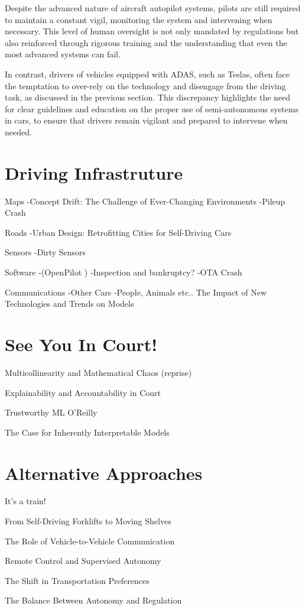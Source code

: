 Despite the advanced nature of aircraft autopilot systems, pilots are still required to maintain a constant vigil, monitoring the system and intervening when necessary. This level of human oversight is not only mandated by regulations but also reinforced through rigorous training and the understanding that even the most advanced systems can fail.

In contrast, drivers of vehicles equipped with ADAS, such as Teslas, often face the temptation to over-rely on the technology and disengage from the driving task, as discussed in the previous section. This discrepancy highlights the need for clear guidelines and education on the proper use of semi-autonomous systems in cars, to ensure that drivers remain vigilant and prepared to intervene when needed.


\section{Driving Infrastruture}

Maps
-Concept Drift: The Challenge of Ever-Changing Environments
-Pileup Crash \cite{pileupcrash}

Roads
-Urban Design: Retrofitting Cities for Self-Driving Cars

Sensors
-Dirty Sensors 

Software 
-(OpenPilot \cite{openpilot})
-Inspection and bankruptcy?
-OTA Crash \cite{otacrash}

Communications
-Other Cars
-People, Animals etc.. The Impact of New Technologies and Trends on Models


\section{See You In Court!}

Multicollinearity and Mathematical Chaos (reprise)

Explainability and Accountability in Court

Trustworthy ML O'Reilly \cite{trustworthyml}

The Case for Inherently Interpretable Models

\section{Alternative Approaches}

It's a train!

From Self-Driving Forklifts to Moving Shelves

The Role of Vehicle-to-Vehicle Communication

Remote Control and Supervised Autonomy

The Shift in Transportation Preferences

The Balance Between Autonomy and Regulation
